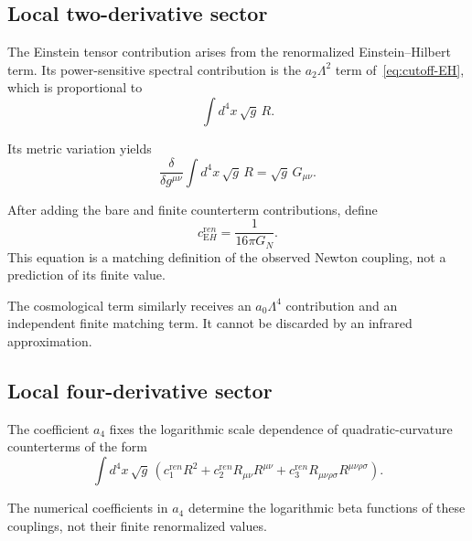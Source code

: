\documentclass[pdflatex,sn-mathphys-num]{sn-jnl} %
\theoremstyle{remark}
\theoremstyle{plain}
\begin{document}
  \subsection{Local two-derivative sector}
    \label{subsec:two-derivative}

    The Einstein tensor contribution arises from the renormalized Einstein--Hilbert term.
    Its power-sensitive spectral contribution is the $a_2\Lambda^2$ term of~\eqref{eq:cutoff-EH}, which is proportional
    to
    \begin{equation}
      \int d^4x\,\sqrt{g}\, R .
    \end{equation}

    Its metric variation yields
    \begin{equation}
      \frac{\delta}{\delta g^{\mu\nu}}
      \int d^4x\,\sqrt{g}\, R
      =
      \sqrt{g}\, G_{\mu\nu}.
    \end{equation}

    After adding the bare and finite counterterm contributions, define
    \begin{equation}
      c_{\mathrm EH}^{\mathrm ren}
      =
      \frac{1}{16\pi G_N}.
      \label{eq:cEH-matching}
    \end{equation}
    This equation is a matching definition of the observed Newton coupling, not a prediction of its finite value.

    The cosmological term similarly receives an $a_0\Lambda^4$ contribution and an independent finite matching term.
    It cannot be discarded by an infrared approximation.

  \subsection{Local four-derivative sector}
    \label{subsec:four-derivative}

    The coefficient $a_4$ fixes the logarithmic scale dependence of quadratic-curvature counterterms of the form
    \begin{equation}
      \int d^4x\,\sqrt{g}\,
      \left(
        c_1^{\mathrm ren} R^2
      +
        c_2^{\mathrm ren} R_{\mu\nu}R^{\mu\nu}
        +
        c_3^{\mathrm ren} R_{\mu\nu\rho\sigma}R^{\mu\nu\rho\sigma}
      \right).
    \end{equation}

    The numerical coefficients in $a_4$ determine the logarithmic beta functions of these couplings, not their finite
    renormalized values.
\end{document}
